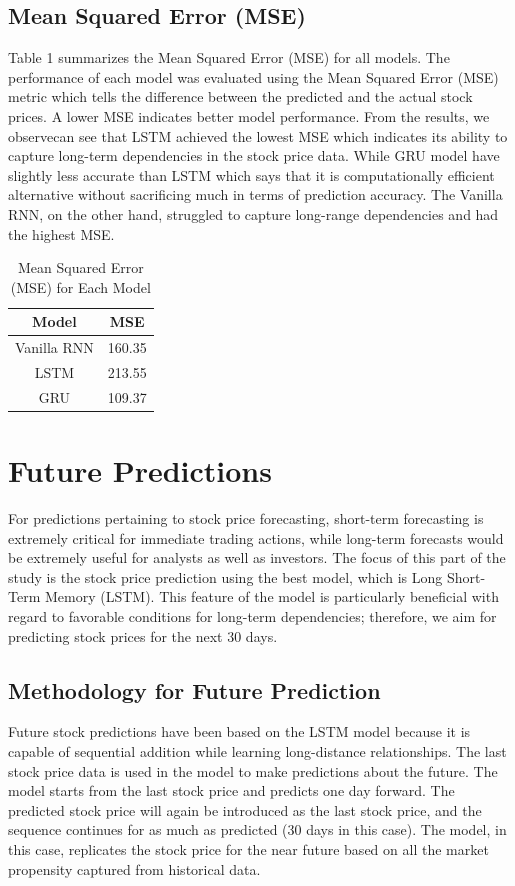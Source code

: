 \documentclass[10pt,twocolumn,a4paper]{article}
\begin{document}
\subsection{Mean Squared Error (MSE)}
Table 1 summarizes the Mean Squared Error (MSE) for all models. The performance of each model was evaluated using the Mean Squared Error (MSE) metric which tells the difference between the predicted and the actual stock prices. A lower MSE indicates better model performance. From the results, we observecan see  that LSTM achieved the lowest MSE which indicates  its ability to capture long-term dependencies in the stock price data. While GRU model have  slightly less accurate than LSTM which says that it is  computationally efficient alternative without sacrificing much in terms of prediction accuracy. The Vanilla RNN, on the other hand, struggled to capture long-range dependencies and had the highest MSE.
\begin{table}[h]
\centering
\begin{tabular}{|c|c|}
\hline
\textbf{Model} & \textbf{MSE} \\
\hline
Vanilla RNN & 160.35 \\
LSTM        & 213.55 \\
GRU         & 109.37 \\
\hline
\end{tabular}
\caption{Mean Squared Error (MSE) for Each Model}
\end{table}

\section{Future Predictions}
For predictions pertaining to stock price forecasting, short-term forecasting is extremely critical for immediate trading actions, while long-term forecasts would be extremely useful for analysts as well as investors. The focus of this part of the study is the stock price prediction using the best model, which is Long Short-Term Memory (LSTM). This feature of the model is particularly beneficial with regard to favorable conditions for long-term dependencies; therefore, we aim for predicting stock prices for the next 30 days.

\subsection{Methodology for Future Prediction}
Future stock predictions have been based on the LSTM model because it is capable of sequential addition while learning long-distance relationships. The last stock price data is used in the model to make predictions about the future. The model starts from the last stock price and predicts one day forward. The predicted stock price will again be introduced as the last stock price, and the sequence continues for as much as predicted (30 days in this case). The model, in this case, replicates the stock price for the near future based on all the market propensity captured from historical data.
\end{document}
